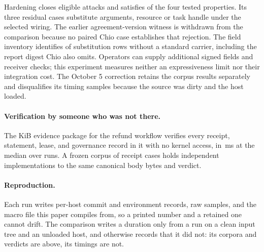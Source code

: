Hardening closes \PSBaseClosedByHardening{} eligible attacks and satisfies
\PSBasePropsHoldHardened{} of the four tested properties. Its three residual
cases substitute arguments, resource or task handle under the selected wiring.
The earlier agreement-version witness is withdrawn from the comparison because
no paired Chio case establishes that rejection. The field inventory identifies
\PSBaseSubstNotCarriedRows{} of \PSBaseSubstRows{} substitution rows without a
standard carrier, including the report digest Chio also omits. Operators can
supply additional signed fields and receiver checks; this experiment measures
neither an expressiveness limit nor their integration cost. The October 5
correction retains the corpus results separately and disqualifies its timing
samples because the source was dirty and the host loaded.

\paragraph{Verification by someone who was not there.}
The \PSProofPackageKiB{} KiB evidence package for the refund workflow verifies
every receipt, statement, lease, and governance record in it with no kernel
access, in \,ms at the median over
\PSBuyerVerifySampleCount{} runs. A frozen corpus of
\PSVectorCaseCount{} receipt cases holds \PSVectorLanguages{} independent
implementations to the same canonical body bytes and verdict.

\paragraph{Reproduction.}
Each run writes per-host commit and environment records, raw samples, and the
macro file this paper compiles from, so a printed number and a retained one
cannot drift. The comparison writes a duration only from a run on a clean input
tree and an unloaded host, and otherwise records that it did not: its corpora
and verdicts are above, its timings are not.
